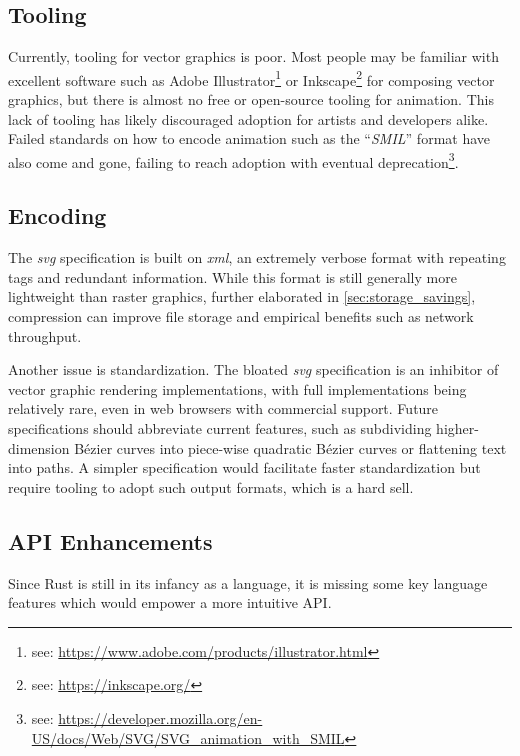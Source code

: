 \subsection{Tooling}
Currently, tooling for vector graphics is poor. Most people may be familiar with excellent software such as Adobe Illustrator\footnote{see: \href{https://www.adobe.com/products/illustrator.html}{https://www.adobe.com/products/illustrator.html}} or Inkscape\footnote{see: \href{https://inkscape.org/}{https://inkscape.org/}} for composing vector graphics, but there is almost no free or open-source tooling for animation. This lack of tooling has likely discouraged adoption for artists and developers alike. Failed standards on how to encode animation such as the ``\textit{SMIL}'' format have also come and gone, failing to reach adoption with eventual deprecation\footnote{see: \href{https://developer.mozilla.org/en-US/docs/Web/SVG/SVG_animation_with_SMIL}{https://developer.mozilla.org/en-US/docs/Web/SVG/SVG\_animation\_with\_SMIL}}.\medskip

\subsection{Encoding}
The \textit{svg} specification is built on \textit{xml}, an extremely verbose format with repeating tags and redundant information. While this format is still generally more lightweight than raster graphics, further elaborated in \cref{sec:storage_savings}, compression can improve file storage and empirical benefits such as network throughput.\medskip

Another issue is standardization. The bloated \textit{svg} specification is an inhibitor of vector graphic rendering implementations, with full implementations being relatively rare, even in web browsers with commercial support. Future specifications should abbreviate current features, such as subdividing higher-dimension Bézier curves into piece-wise quadratic Bézier curves or flattening text into paths. A simpler specification would facilitate faster standardization but require tooling to adopt such output formats, which is a hard sell.

\subsection{API Enhancements}
Since Rust is still in its infancy as a language, it is missing some key language features which would empower a more intuitive API.\medskip

